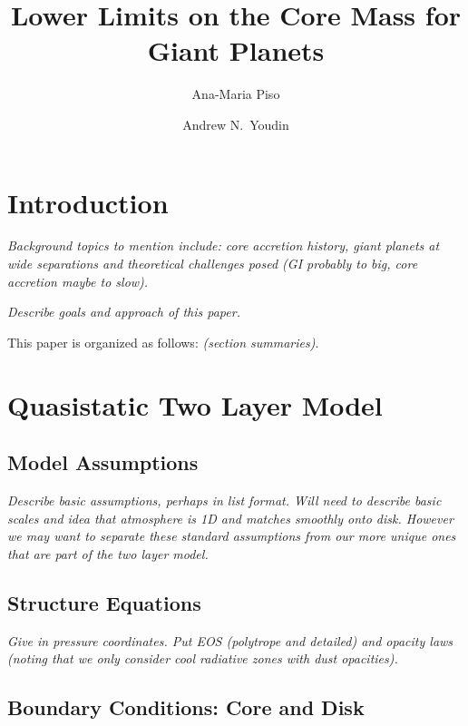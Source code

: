 \documentclass[12pt, preprint,numberedappendix]{emulateapj}
\newcommand{\emgr}[1]{\emph{ \color{gray} #1}}
\begin{document}



\title{Lower Limits on the Core Mass for Giant Planets}
\author{Ana-Maria Piso}
\author{ Andrew N.\ Youdin}

\section{Introduction}
\emgr{Background topics to mention include: core accretion history, giant planets at wide separations and theoretical challenges posed (GI probably to big, core accretion maybe to slow).}

\emgr{Describe goals and approach of this paper.}

This paper is organized as follows: \emgr{(section summaries)}.


\section{Quasistatic Two Layer Model}\label{sec:model}

\subsection{Model Assumptions}
\emgr{Describe basic assumptions, perhaps in list format. Will need to describe basic scales and idea that atmosphere is 1D and matches smoothly onto disk.  However we may want to separate these standard assumptions from our more unique ones that are part of the two layer model.}

\subsection{Structure Equations}
\emgr{Give in pressure coordinates.  Put EOS (polytrope and detailed) and opacity laws (noting that we only consider cool radiative zones with dust opacities).}

\subsection{Boundary Conditions: Core and Disk} 
\end{document}
